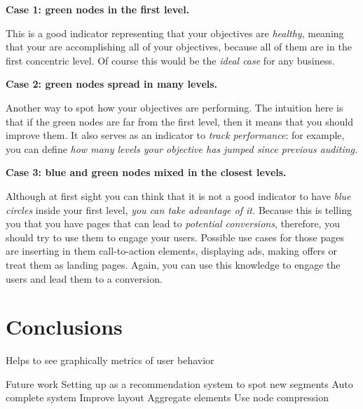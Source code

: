 \documentclass[preprint,12pt,3p]{elsarticle}
\begin{document}
\textbf{Case 1: green nodes in the first level.}

This is a good indicator representing that your objectives are \textit{healthy}, meaning that your are accomplishing all of your objectives, because all of them are in the first concentric level. Of course this would be the \textit{ideal case} for any business.

\textbf{Case 2: green nodes spread in many levels.}

Another way to spot how your objectives are performing. The intuition here is that if the green nodes are far from the first level, then it means that you should improve them. It also serves as an indicator to \textit{track performance}: for example, you can define \textit{how many levels your objective has jumped since previous auditing.}

\textbf{Case 3: blue and green nodes mixed in the closest levels.}

Although at first sight you can think that it is not a good indicator to have \textit{blue circles} inside your first level, \textit{you can take advantage of it.}
Because this is telling you that you have pages that can lead to \textit{potential conversions}, therefore, you should try to use them to engage your users. Possible use cases for those pages are inserting in them call-to-action elements, displaying ads, making offers or treat them as landing pages. Again, you can use this knowledge to engage the users and lead them to a conversion.



\section{Conclusions}
Helps to see graphically metrics of user behavior

Future work
Setting up as a recommendation system to spot new segments
Auto complete system
Improve layout
Aggregate elements
Use node compression




% 
% 
% 
% 
% 
% 
% 
% 
% 
% 
% 
% 


\end{document}
